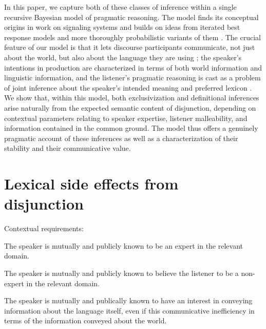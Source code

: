 \documentclass{article}
\begin{document}
In this paper, we capture both of these classes of inference within a
single recursive Bayesian model of pragmatic reasoning. The model
finds its conceptual origins in  work on signaling
systems and builds on ideas from iterated best response models
\citet{Jaeger:2007,Jaeger:2011,Franke09DISS} and more thoroughly
probabilistic variants of them
\citep{CamererHo:2004,Frank:Goodman:2012}. The crucial feature of our
model is that it lets discourse participants communicate, not just
about the world, but also about the language they are using
\citep{Bergen:Goodman:Levy:2012,bergen-levy-goodman:2014}; the
speaker's intentions in production are characterized in terms of both
world information and linguistic information, and the listener's
pragmatic reasoning is cast as a problem of joint inference about the
speaker's intended meaning and preferred lexicon
\citep{Smith:Goodman:Frank:2013}. We show that, within this model,
both exclusivization and definitional inferences arise naturally from
the expected semantic content of disjunction, depending on contextual
parameters relating to speaker expertise, listener malleability, and
information contained in the common ground. The model thus offers a
genuinely pragmatic account of these inferences as well as a
characterization of their stability and their communicative value.


\section{Lexical side effects from disjunction}\label{sec:data}

Contextual requirements: 

\begin{examples}
\item The speaker is mutually and publicly known to be an expert in
  the relevant domain.
  
\item The speaker is mutually and publicly known to believe the
  listener to be a non-expert in the relevant domain.
  
\item The speaker is mutually and publically known to have an
  interest in conveying information about the language itself,
  even if this communicative inefficiency in terms of the 
  information conveyed about the world.
\end{examples}
\end{document}

